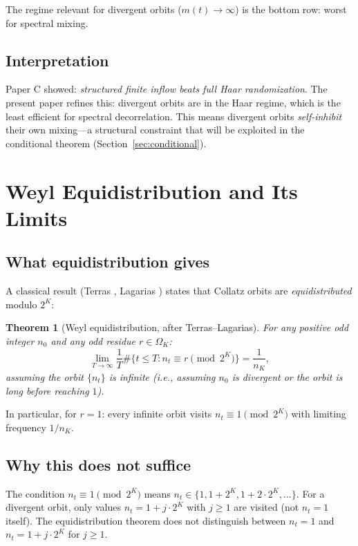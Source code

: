 \documentclass[12pt]{article}
\newtheorem{theorem}{Theorem}[section]
\theoremstyle{definition}
\newcommand{\OK}{\Omega_K}
\begin{document}
The regime relevant for divergent orbits ($m(t) \to \infty$) is the bottom row: worst for spectral mixing.

\subsection{Interpretation}

Paper C showed: \emph{structured finite inflow beats full Haar randomization}. The present paper refines this: divergent orbits are in the Haar regime, which is the least efficient for spectral decorrelation. This means divergent orbits \emph{self-inhibit} their own mixing---a structural constraint that will be exploited in the conditional theorem (Section~\ref{sec:conditional}).

\section{Weyl Equidistribution and Its Limits}
\label{sec:weyl}

\subsection{What equidistribution gives}

A classical result (Terras \cite{Terras1976}, Lagarias \cite{Lagarias1985}) states that Collatz orbits are \emph{equidistributed} modulo $2^K$:

\begin{theorem}[Weyl equidistribution, after Terras--Lagarias]
\label{thm:weyl}
For any positive odd integer $n_0$ and any odd residue $r \in \OK$:
\[
  \lim_{T \to \infty} \frac{1}{T} \#\{t \leq T : n_t \equiv r \pmod{2^K}\} = \frac{1}{n_K},
\]
assuming the orbit $\{n_t\}$ is infinite (i.e., assuming $n_0$ is divergent or the orbit is long before reaching $1$).
\end{theorem}

In particular, for $r = 1$: every infinite orbit visits $n_t \equiv 1 \pmod{2^K}$ with limiting frequency $1/n_K$.

\subsection{Why this does not suffice}

The condition $n_t \equiv 1 \pmod{2^K}$ means $n_t \in \{1, 1+2^K, 1+2\cdot 2^K, \ldots\}$. For a divergent orbit, only values $n_t = 1 + j \cdot 2^K$ with $j \geq 1$ are visited (not $n_t = 1$ itself). The equidistribution theorem does not distinguish between $n_t = 1$ and $n_t = 1 + j \cdot 2^K$ for $j \geq 1$.
\end{document}

